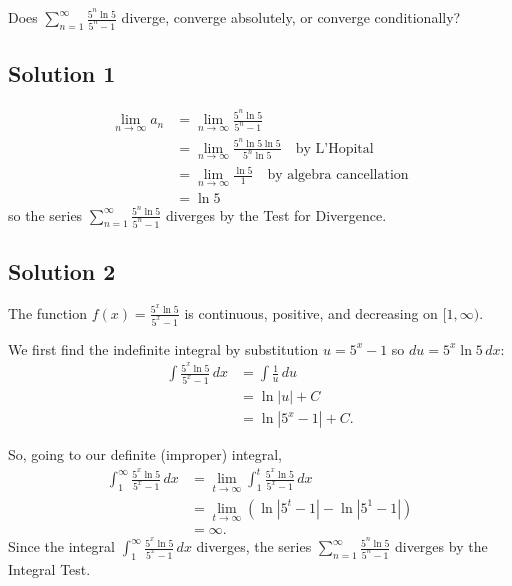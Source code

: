 \documentclass{article}
\begin{document}
\noindent
Does $\displaystyle \sum_{n=1}^\infty \frac{5^n \ln 5}{5^n-1}$
diverge, converge absolutely, or converge conditionally?

\subsection*{Solution 1}

\begin{align*}
\lim_{n \to \infty} a_n
&= \lim_{n \to \infty} \frac{5^n \ln 5}{5^n-1} \\
&= \lim_{n \to \infty} \frac{5^n \ln 5 \ln 5}{5^n \ln 5} \quad\text{by L'Hopital} \\
&= \lim_{n \to \infty} \frac{\ln 5}{1} \quad\text{by algebra cancellation} \\
& = \ln 5
\end{align*}
so the series $\displaystyle \sum_{n=1}^\infty \frac{5^n \ln 5}{5^n-1}$ diverges by the Test for Divergence.

\subsection*{Solution 2}

The function $f(x)=\frac{5^x \ln 5}{5^x-1}$ is continuous, positive, and decreasing on $[1,\infty)$.

We first find the indefinite integral by substitution $u=5^x-1$ so $du = 5^x \ln 5\,dx$:
\begin{align*}
\int \frac{5^x \ln 5}{5^x-1}\,dx
&= \int \frac1u\,du\\
&= \ln |u|+C\\
&= \ln |5^x-1|+C.
\end{align*}

So, going to our definite (improper) integral,
\begin{align*}
\int_1^\infty  \frac{5^x \ln 5}{5^x-1}\,dx
&= \lim_{t \to \infty} \int_1^t  \frac{5^x \ln 5}{5^x-1}\,dx\\
&= \lim_{t \to \infty} ( \ln |5^t-1| - \ln |5^1-1| )\\
&= \infty.
\end{align*}
Since the integral $\displaystyle \int_1^\infty \frac{5^x \ln 5}{5^x-1}\,dx$ diverges, the  series  $\displaystyle \sum_{n=1}^\infty \frac{5^n \ln 5}{5^n-1}$ diverges by the Integral Test.
\end{document}
